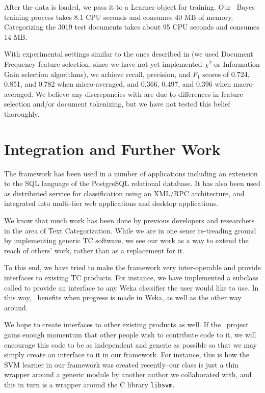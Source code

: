 \begin{singlespace}
After the data is loaded, we pass it to a Learner object for training.
Our \naive\ Bayes training process takes 8.1 CPU seconds and consumes
40 MB of memory.  Categorizing the 3019 test documents takes about 95
CPU seconds and consumes 14 MB.

With experimental settings similar to the ones described in
\cite{yang:99} (we used Document Frequency feature selection, since we
have not yet implemented $\chi^2$ or Information Gain selection
algorithms), we achieve recall, precision, and $F_1$ scores of 0.724,
0.851, and 0.782 when micro-averaged, and 0.366, 0.497, and 0.396 when
macro-averaged.  We believe any discrepancies with \cite{yang:99} are
due to differences in feature selection and/or document tokenizing,
but we have not tested this belief thoroughly.

\section{Integration and Further Work}


The framework has been used in a number of applications including an
extension to the SQL language of the PostgreSQL relational
database. It has also been used as distributed service for
classification using an XML/RPC architecture, and integrated into
multi-tier web applications and desktop applications.

We know that much work has been done by previous developers and
researchers in the area of Text Categorization.  While we are in one
sense re-treading ground by implementing generic TC software, we see
our work as a way to extend the reach of others' work, rather than as
a replacement for it.

To this end, we have tried to make the framework very inter-operable
and provide interfaces to existing TC products.  For instance, we have
implemented a  subclass called 
to provide an interface to any Weka classifier the user would like to
use.  In this way, \aicat\ benefits when progress is
made in Weka, as well as the other way around.

We hope to create interfaces to other existing products as well.  If the
\aicat\ project gains enough momentum that other
people wish to contribute code to it, we will encourage this code to
be as independent and generic as possible so that we may simply
create an interface to it in our framework.  For instance, this is 
how the SVM learner in our framework was created recently--our
\aicat{} class is just a thin wrapper around a
generic  module by another author we
collaborated with, and this in turn is a wrapper around the C library
\texttt{libsvm}.


\end{singlespace}
